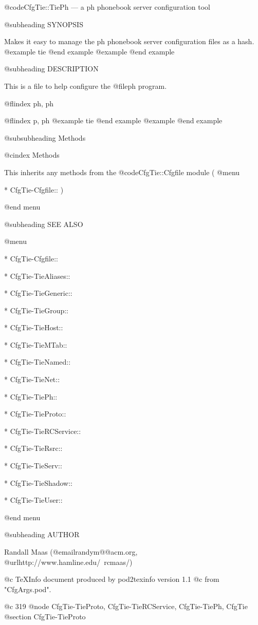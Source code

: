 {{{{{{{{{{{{{{{{@code{CfgTie::TiePh} --- a ph phonebook server configuration tool

@subheading SYNOPSIS

Makes it easy to manage the ph phonebook server configuration files as a hash.
@example
   tie %
@end example
@example
@end example

@subheading DESCRIPTION

This is a file to help configure the @file{ph} program.

@flindex ph, ph

@flindex p, ph
@example
   tie %
@end example
@example
@end example

@subsubheading Methods

@cindex Methods

This inherits any methods from the @code{CfgTie::Cfgfile} module
(
@menu

* CfgTie-Cfgfile::	
)

@end menu

@subheading SEE ALSO


@menu

* CfgTie-Cfgfile::	
   
* CfgTie-TieAliases::	
 
* CfgTie-TieGeneric::	


* CfgTie-TieGroup::	
  
* CfgTie-TieHost::	
    
* CfgTie-TieMTab::	


* CfgTie-TieNamed::	
  
* CfgTie-TieNet::	
     
* CfgTie-TiePh::	


* CfgTie-TieProto::	
  
* CfgTie-TieRCService::	
 
* CfgTie-TieRsrc::	


* CfgTie-TieServ::	
   
* CfgTie-TieShadow::	
 
* CfgTie-TieUser::	


@end menu

@subheading AUTHOR

Randall Maas (@email{randym@@acm.org}, @url{http://www.hamline.edu/~rcmaas/})

@c TeXInfo document produced by pod2texinfo version 1.1
@c from "CfgArgs.pod".


@c 319
@node CfgTie-TieProto, CfgTie-TieRCService, CfgTie-TiePh, CfgTie
@section CfgTie-TieProto


}}}}}}}}}}}}}}}}
